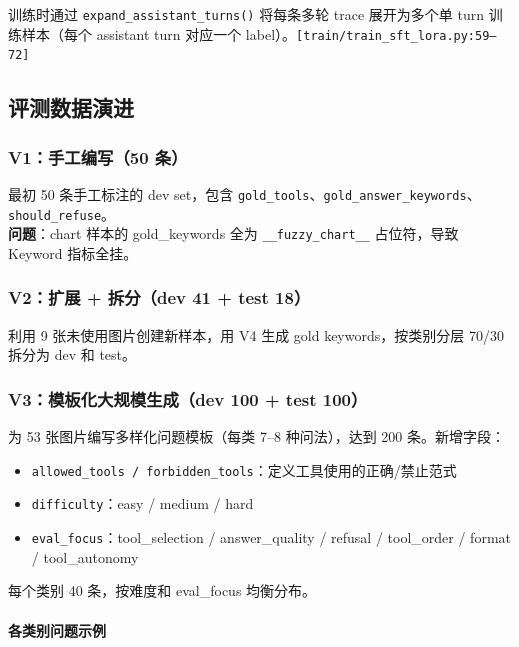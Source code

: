 \documentclass[12pt,a4paper]{ctexart}
\begin{document}
训练时通过 \texttt{expand\_assistant\_turns()} 将每条多轮 trace 展开为多个单 turn 训练样本（每个 assistant turn 对应一个 label）。\texttt{[train/train\_sft\_lora.py:59--72]}

\subsection{评测数据演进}

\subsubsection{V1：手工编写（50 条）}

最初 50 条手工标注的 dev set，包含 \texttt{gold\_tools}、\texttt{gold\_answer\_keywords}、\texttt{should\_refuse}。\\

\textbf{问题}：chart 样本的 gold\_keywords 全为 \texttt{\_\_fuzzy\_chart\_\_} 占位符，导致 Keyword 指标全挂。

\subsubsection{V2：扩展 + 拆分（dev 41 + test 18）}

利用 9 张未使用图片创建新样本，用 V4 生成 gold keywords，按类别分层 70/30 拆分为 dev 和 test。

\subsubsection{V3：模板化大规模生成（dev 100 + test 100）}

为 53 张图片编写多样化问题模板（每类 7--8 种问法），达到 200 条。新增字段：

\begin{itemize}[nosep]
  \item \texttt{allowed\_tools / forbidden\_tools}：定义工具使用的正确/禁止范式
  \item \texttt{difficulty}：easy / medium / hard
  \item \texttt{eval\_focus}：tool\_selection / answer\_quality / refusal / tool\_order / format / tool\_autonomy
\end{itemize}

每个类别 40 条，按难度和 eval\_focus 均衡分布。

\paragraph{各类别问题示例}
\end{document}
